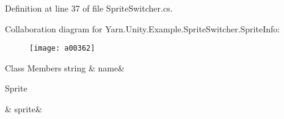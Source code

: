Definition at line 37 of file Sprite\-Switcher.\-cs.



Collaboration diagram for Yarn.\-Unity.\-Example.\-Sprite\-Switcher.\-Sprite\-Info\-:
\nopagebreak
\begin{figure}[H]
\begin{center}
\leavevmode
\texttt{[image: a00362]}
\end{center}
\end{figure}
\begin{DoxyFields}{Class Members}
\hypertarget{a00148_a3f5bca2fff413dfe075c1fcf7e58369c}{string}\label{a00148_a3f5bca2fff413dfe075c1fcf7e58369c}
&
name&
\\
\hline

\hypertarget{a00148_adc58df011dc2841837b6cf775b372061}{Sprite}\label{a00148_adc58df011dc2841837b6cf775b372061}
&
sprite&
\\
\hline

\end{DoxyFields}
